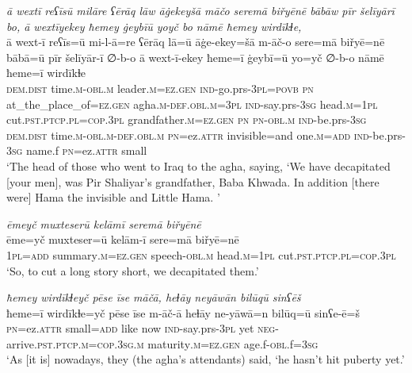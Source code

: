 \ea \label{BP.122}
\textit{ā wextī reʕīsū milāre ʕērāq lāw āġekeyšā māčo seremā biřyēnē bābāw pīr šelīyārī bo, ā wextīyekey ħemey ġeybīū yoyč bo nāmē ħemey wirdīkɫe,} \\ 
\gll ā wext-ī reʕīs=ū mi-l-ā=re ʕērāq lā=ū āġe-ekey=šā m-āč-o sere=mā biřyē=nē bābā=ū pīr šelīyār-ī ∅-b-o ā wext-ī-ekey ħeme=ī ġeybī=ū yo=yč ∅-b-o nāmē ħeme=ī wirdīkɫe \\ 
 \textsc{dem.dist} time\textsc{.m}\textsc{-obl}\textsc{.m} leader\textsc{.m}\textsc{=ez.gen} \textsc{ind-}go.prs\textsc{-3pl}\textsc{=\textsc{povb}} \textsc{pn} at\_the\_place\_of\textsc{=ez.gen} agha\textsc{.m}\textsc{-def}\textsc{.obl}\textsc{.m}\textsc{=3pl} \textsc{ind-}say.prs\textsc{-3sg} head\textsc{.m}\textsc{=\textsc{1pl}} cut\textsc{.pst}\textsc{.ptcp}\textsc{.pl}\textsc{=cop}\textsc{.3pl} grandfather\textsc{.m}\textsc{=ez.gen} \textsc{pn} \textsc{pn}\textsc{-obl}\textsc{.m} \textsc{ind-}be.prs\textsc{-3sg} \textsc{dem.dist} time\textsc{.m}\textsc{-obl}\textsc{.m}\textsc{-def}\textsc{.obl}\textsc{.m} \textsc{pn}=ez.\textsc{attr} invisible=and one\textsc{.m}\textsc{=add} \textsc{ind-}be.prs\textsc{-3sg} name.f \textsc{pn}=ez.\textsc{attr} small \\ 
\glt `The head of those who went to Iraq to the agha, saying, ‘We have decapitated [your men], was Pir Shaliyar’s grandfather, Baba Khwada. In addition [there were] Hama the invisible and Little Hama. '
\z 
 
\ea \label{BP.127}
\textit{ēmeyč muxteserū kelāmī seremā biřyēnē} \\ 
\gll ēme=yč muxteser=ū kelām-ī sere=mā biřyē=nē \\ 
 \textsc{1pl}\textsc{=add} summary\textsc{.m}\textsc{=ez.gen} speech\textsc{-obl}\textsc{.m} head\textsc{.m}\textsc{=\textsc{1pl}} cut\textsc{.pst}\textsc{.ptcp}\textsc{.pl}\textsc{=cop}\textsc{.3pl} \\ 
\glt `So, to cut a long story short, we decapitated them.'
\z 
 
\ea \label{BP.132}
\textit{ħemey wirdīkɫeyč pēse īse māčā, heɫāy neyāwān bilūqū sinʕēš} \\ 
\gll ħeme=ī wirdīkɫe=yč pēse īse m-āč-ā heɫāy ne-yāwā=n bilūq=ū sinʕe-ē=š \\ 
 \textsc{pn}=ez.\textsc{attr} small\textsc{=add} like now \textsc{ind-}say.prs\textsc{-3pl} yet \textsc{neg-}arrive\textsc{.pst}\textsc{.ptcp}\textsc{.m}\textsc{=cop}\textsc{.3sg}\textsc{.m} maturity\textsc{.m}\textsc{=ez.gen} age.f\textsc{-obl}.f\textsc{=3sg} \\ 
\glt `As [it is] nowadays, they (the agha’s attendants) said, ‘he hasn’t hit puberty yet.'
\z 
 
